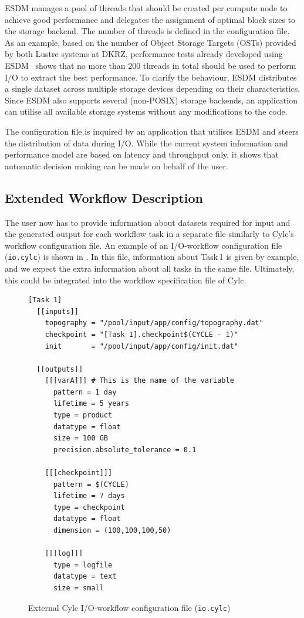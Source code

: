 \documentclass{superfri}
\begin{document}
ESDM manages a pool of threads that should be created per compute node to achieve good performance and delegates the assignment of optimal block sizes to the storage backend.
The number of threads is defined in the configuration file.
As an example, based on the number of Object Storage Targets (OSTs) provided by both Lustre systems at DKRZ, performance tests already developed using ESDM~\cite{2019_3361225} shows that no more than 200 threads in total should be used to perform I/O to extract the best performance.
To clarify the behaviour, ESDM distributes a single dataset across multiple storage devices depending on their characteristics.
Since ESDM also supports several (non-POSIX) storage backends, an application can utilise all available storage systems without any modifications to the code.

The configuration file is inquired by an application that utilises ESDM and steers the distribution of data during I/O.
While the current system information and performance model are based on latency and throughput only, it shows that automatic decision making can be made on behalf of the user.

\subsection{Extended Workflow Description}

The user now has to provide information about datasets required for input and the generated output for each workflow task in a separate file similarly to Cylc's workflow configuration file.
An example of an I/O-workflow configuration file (\texttt{io.cylc}) is shown in . In this file, information about Task\,1 is given by example, and we expect the extra information about all tasks in the same file. Ultimately, this could be integrated into the workflow specification file of Cylc.

\begin{figure}[!ht]

\begin{lstlisting}
[Task 1]
  [[inputs]]
    topography = "/pool/input/app/config/topography.dat"
    checkpoint = "[Task 1].checkpoint$(CYCLE - 1)"
    init       = "/pool/input/app/config/init.dat"

  [[outputs]]
    [[[varA]]] # This is the name of the variable
      pattern = 1 day
      lifetime = 5 years
      type = product
      datatype = float
      size = 100 GB
      precision.absolute_tolerance = 0.1

    [[[checkpoint]]]
      pattern = $(CYCLE)
      lifetime = 7 days
      type = checkpoint
      datatype = float
      dimension = (100,100,100,50)

    [[[log]]]
      type = logfile
      datatype = text
      size = small
\end{lstlisting}

\caption{External Cylc I/O-workflow configuration file (\texttt{io.cylc})}
\label{lst:cylc}
\end{figure}
\end{document}
